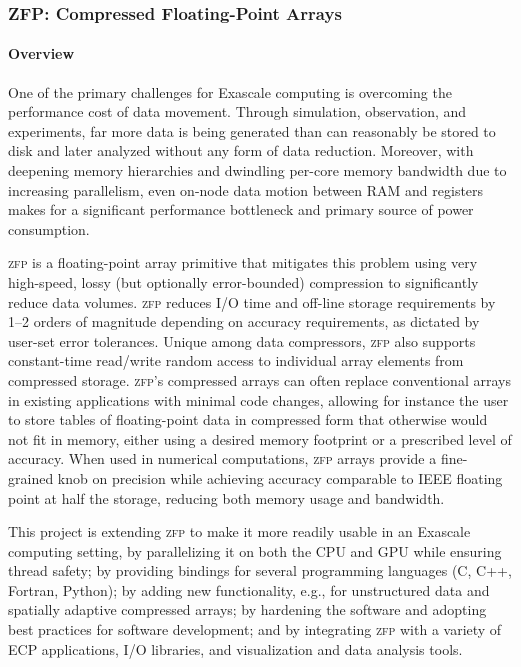 \newcommand{\zfp}{\textsc{zfp}}

\subsubsection{ZFP: Compressed Floating-Point Arrays}

\paragraph{Overview} 

One of the primary challenges for Exascale computing is overcoming the
performance cost of data movement.  Through simulation, observation, and
experiments, far more data is being generated than can reasonably be stored
to disk and later analyzed without any form of data reduction.  Moreover,
with deepening memory hierarchies and dwindling per-core memory bandwidth
due to increasing parallelism, even on-node data motion between RAM and
registers makes for a significant performance bottleneck and primary source
of power consumption.

{\zfp} is a floating-point array primitive that mitigates this problem using
very high-speed, lossy (but optionally error-bounded) compression to
significantly reduce data volumes.  {\zfp} reduces I/O time and off-line
storage requirements by 1--2 orders of magnitude depending on accuracy
requirements, as dictated by user-set error tolerances.  Unique among data
compressors, {\zfp} also supports constant-time read/write random access to
individual array elements from compressed storage.  {\zfp}'s compressed arrays
can often replace conventional arrays in existing applications with minimal
code changes, allowing for instance the user to store tables of floating-point
data in compressed form that otherwise would not fit in memory, either using
a desired memory footprint or a prescribed level of accuracy.  When used in
numerical computations, {\zfp} arrays provide a fine-grained knob on precision
while achieving accuracy comparable to IEEE floating point at half the
storage, reducing both memory usage and bandwidth.

This project is extending {\zfp} to make it more readily usable in an Exascale
computing setting, by parallelizing it on both the CPU and GPU while ensuring
thread safety; by providing bindings for several programming languages (C,
C++, Fortran, Python); by adding new functionality, e.g., for unstructured
data and spatially adaptive compressed arrays; by hardening the software and
adopting best practices for software development; and by integrating {\zfp}
with a variety of ECP applications, I/O libraries, and visualization and data
analysis tools.


